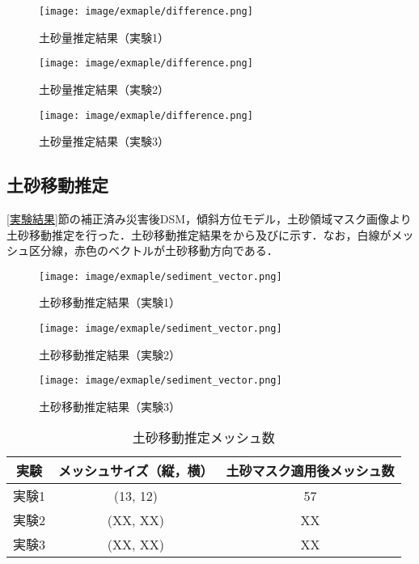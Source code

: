      \begin{figure}[tbp]
        \centering
        \texttt{[image: image/exmaple/difference.png]}
        \caption{土砂量推定結果（実験1）}
        \label{土砂量推定結果（実験1）}
      \end{figure}

      \begin{figure}[tbp]
        \centering
        \texttt{[image: image/exmaple/difference.png]}
        \caption{土砂量推定結果（実験2）}
      \end{figure}

      \begin{figure}[tbp]
        \centering
        \texttt{[image: image/exmaple/difference.png]}
        \caption{土砂量推定結果（実験3）}
        \label{土砂量推定結果（実験3）}
      \end{figure}


    \subsection*{土砂移動推定}
      \ref{実験結果}節の補正済み災害後DSM，傾斜方位モデル，土砂領域マスク画像より土砂移動推定を行った．土砂移動推定結果をから及びに示す．なお，白線がメッシュ区分線，赤色のベクトルが土砂移動方向である．

      \begin{figure}[tbp]
        \centering
        \texttt{[image: image/exmaple/sediment\_vector.png]}
        \caption{土砂移動推定結果（実験1）}
        \label{土砂移動推定結果（実験1）}
      \end{figure}

      \begin{figure}[tbp]
        \centering
        \texttt{[image: image/exmaple/sediment\_vector.png]}
        \caption{土砂移動推定結果（実験2）}
      \end{figure}

      \begin{figure}[tbp]
        \centering
        \texttt{[image: image/exmaple/sediment\_vector.png]}
        \caption{土砂移動推定結果（実験3）}
        \label{土砂移動推定結果（実験3）}
      \end{figure}

      \begin{table}[tbp]
        \centering
        \caption{土砂移動推定メッシュ数}
        \label{土砂移動推定メッシュ数}
        \begin{tabular}{ccc}
          \hline
          \textbf{実験} & \textbf{メッシュサイズ（縦，横）} & \textbf{土砂マスク適用後メッシュ数} \\
          \hline  \hline
          実験1 & (13, 12) & 57 \\
          実験2 & (XX, XX) & XX \\
          実験3 & (XX, XX) & XX \\ \hline
        \end{tabular}
      \end{table}



